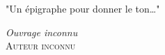 \begin{vcenterpage}
\begin{flushleft}
\epigraph{"Un épigraphe pour donner le ton\dots "}{\textit{Ouvrage inconnu}\\ {\scshape Auteur inconnu}}
\end{flushleft}
\end{vcenterpage}